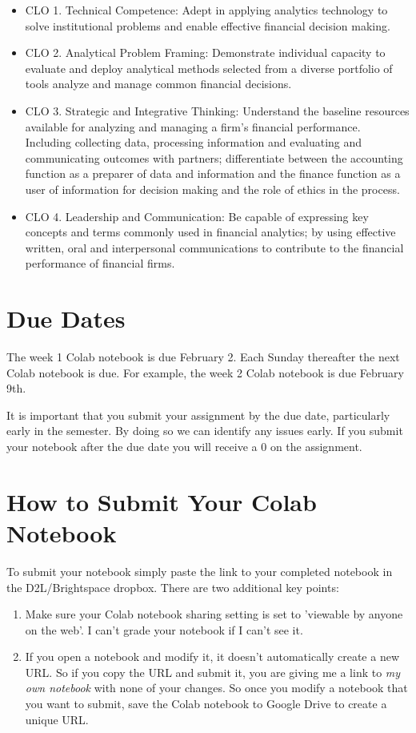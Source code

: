 \documentclass[11pt]{article}
\begin{document}
\begin{itemize}
\item CLO 1. Technical Competence: Adept in applying analytics technology to solve institutional problems and enable effective financial decision making.
\item CLO 2. Analytical Problem Framing: Demonstrate individual capacity to evaluate and deploy analytical methods selected from a diverse portfolio of tools analyze and manage common financial decisions.
\item CLO 3. Strategic and Integrative Thinking: Understand the baseline resources available for analyzing and managing a firm’s financial performance. Including collecting data, processing information and evaluating and communicating outcomes with partners; differentiate between the accounting function as a preparer of data and information and the finance function as a user of information for decision making and the role of ethics in the process.
\item CLO 4. Leadership and Communication: Be capable of expressing key concepts and terms commonly used in financial analytics; by using effective written, oral and interpersonal communications to contribute to the financial performance of financial firms.
\end{itemize}
\section{Due Dates}
\label{sec:org6034ff2}

The week 1 Colab notebook is due February 2.  Each Sunday thereafter the next Colab notebook is due.  For example, the week 2 Colab notebook is due February 9th.

It is important that you submit your assignment by the due date, particularly early in the semester.  By doing so we can identify any issues early.  If you submit your notebook after the due date you will receive a 0 on the assignment.
\section{How to Submit Your Colab Notebook}
\label{sec:org4002e58}

To submit your notebook simply paste the link to your completed notebook in the D2L/Brightspace dropbox.  There are two additional key points:

\begin{enumerate}
\item Make sure your Colab notebook sharing setting is set to 'viewable by anyone on the web'.  I can't grade your notebook if I can't see it.
\item If you open a notebook and modify it, it doesn't automatically create a new URL.  So if you copy the URL and submit it, you are giving me a link to \emph{my own notebook} with none of your changes. So once you modify a notebook that you want to submit, save the Colab notebook to Google Drive to create a unique URL.
\end{enumerate}
\end{document}
